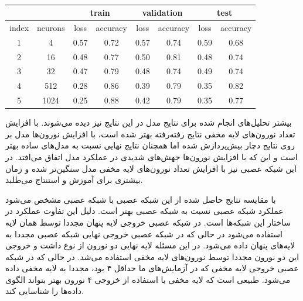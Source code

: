 \documentclass[12pt, a4paper]{article}
\begin{document}
\begin{latin}
\begin{table}[!ht]
    \centering
    \caption{}
    \label{jordan_performance_table}
    \begin{tabular}{c|c|c|c|c|c|c|c}
        & & \multicolumn{2}{c|}{\cellcolor{teal!30}train} & \multicolumn{2}{c|}{\cellcolor{teal!30}validation} &  \multicolumn{2}{c}{\cellcolor{teal!30}test} \\ \hline
        index & neurons & loss & accuracy & loss & accuracy & loss & accuracy\\ \hline
        1 & 4 & 0.57 & 0.72 & 0.57 & 0.74 & 0.59 & 0.68 \\
        2 & 16 & 0.48 & 0.77 & 0.50 & 0.81 & 0.48 & 0.74 \\
        3 & 32 & 0.47 & 0.79 & 0.48 & 0.74 & 0.49 & 0.74 \\
        4 & 512 & 0.28 & 0.86 & 0.39 & 0.79 & 0.35 & 0.82 \\
        5 & 1024 & 0.25 & 0.88 & 0.42 & 0.79 & 0.35 & 0.77 \\
    \end{tabular}
\end{table}
\end{latin}

بیشتر تحلیل‌های انجام شده برای نتایج مدل  در این نتایج نیز دیده می‌شوند. با افزایش تعداد نورون‌های لایه
مخفی نتایج رفته‌رفته بهتر شده است، با افزایش نورون‌ها مدل بر روی نتایج دچار بیش‌پردازش شده اما
همچنان نتایج نهایی نسبت به مدل‌های ساده بهتر است و این که با افزایش
نورون‌ها جهش‌های شدیدی در عملکرد مدل اتفاق می‌افتد. در این شبکه عصبی نیز با افزایش تعداد نورون‌های لایه مخفی
مدل سنگین‌تر شده و زمان بیشتری برای آموزش و استنتاج می‌طلبد.

با مقایسه نتایج حاصل شده از این شبکه عصبی با شبکه عصبی  مشخص می‌شود عملکرد شبکه عصبی  نسبت
به شبکه عصبی  بهتر است. دلیل این تفاوت عملکرد در ساختار این شبکه‌ها است. در شبکه عصبی 
خروجی لایه پنهان مجددا توسط همان لایه استفاده می‌شود در حالی که در شبکه عصبی  خروجی نهایی شبکه عصبی
مجددا به لایه‌های پنهان داده می‌شود. در این مسئله لایه نهایی  دو نورون از نوع  داشت و
خروجی این دو نورون مجددا توسط نورون‌های لایه مخفی استفاده می‌شد. در حالی که در شبکه عصبی  خروجی لایه مخفی
که در آزمایش‌های ما حداقل ۴ بود، مجددا به لایه مخفی داده می‌شود. طبیعی است که لایه مخفی با استفاده از خروجی ۴ نورون
بهتر بتواند الگوی داده‌ها را شناسایی کند.
\end{document}
